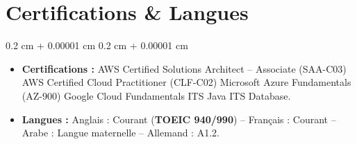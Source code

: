 \documentclass[9pt, letterpaper]{article}
\newenvironment{highlights}{
    \begin{itemize}[
        topsep=0.03 cm,
        parsep=0.03 cm,
        partopsep=0pt,
        itemsep=0pt,
        leftmargin=0.4 cm + 10pt
    ]
}{
    \end{itemize}
}
\newenvironment{onecolentry}{
    \begin{adjustwidth}{
        0.2 cm + 0.00001 cm
    }{
        0.2 cm + 0.00001 cm
    }
}{
    \end{adjustwidth}
}
\begin{document}
    \vspace{0.3 cm}


    \section{Certifications \& Langues}

    \begin{onecolentry}
        \begin{highlights}
            \item \textbf{Certifications :} AWS Certified Solutions Architect -- Associate (SAA-C03) \textbullet{} AWS Certified Cloud Practitioner (CLF-C02) \textbullet{} Microsoft Azure Fundamentals (AZ-900) \textbullet{} Google Cloud Fundamentals \textbullet{} ITS Java \textbullet{} ITS Database.
            \item \textbf{Langues :} Anglais : Courant (\textbf{TOEIC 940/990}) \quad -- \quad Français : Courant \quad -- \quad Arabe : Langue maternelle \quad -- \quad Allemand : A1.2.
        \end{highlights}
    \end{onecolentry}
\end{document}
